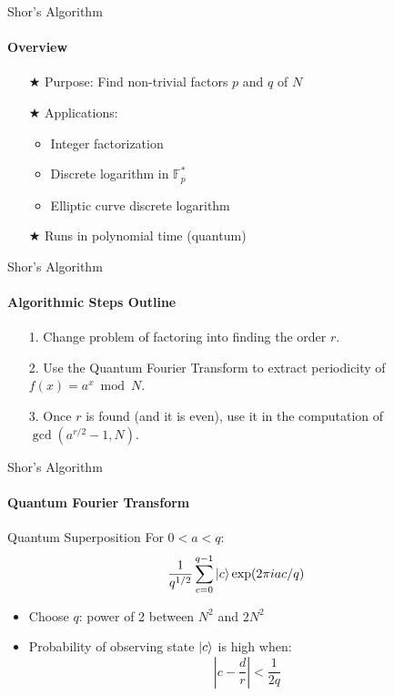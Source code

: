 \documentclass{beamer}
\begin{document}
\begin{frame}{Shor's Algorithm}
	\framesubtitle{Overview}
    \begin{itemize}
        \item[$\bigstar$] Purpose: Find non-trivial factors \(p\) and \(q\) of \(N\)
        \item[$\bigstar$] Applications:
            \begin{itemize}
                \item Integer factorization
                \item Discrete logarithm in \(\mathbb{F}_p^*\)
                \item Elliptic curve discrete logarithm
            \end{itemize}
        \item[$\bigstar$] Runs in polynomial time (quantum)
    \end{itemize}
\end{frame}




\begin{frame}{Shor's Algorithm}
	\framesubtitle{Algorithmic Steps Outline}
	\begin{itemize}
		\item[1.] Change problem of factoring into finding the order \(r\).
		\pause
		\item[2.] Use the Quantum Fourier Transform to extract periodicity of \(f(x) = a^x \bmod N\).
		\pause
		\item[3.] Once \(r\) is found (and it is even), use it in the computation of \(\gcd(a^{r/2} - 1, N)\).   
	\end{itemize}
	
\end{frame}




\begin{frame}{Shor's Algorithm}
	\framesubtitle{Quantum Fourier Transform}
    \begin{block}{Quantum Superposition}
        For \(0 < a < q\):
        \[ \frac{1}{q^{1/2}} \sum_{c = 0}^{q - 1} \ket{c} \exp(2\pi i a c /q) \]
    \end{block}
    \begin{itemize}
        \item Choose \(q\): power of 2 between \(N^2\) and \(2N^2\)
        \item Probability of observing state \(\ket{c}\) is high when:
        \[ \left| c - \frac{d}{r} \right| < \frac{1}{2q} \]
    \end{itemize}
\end{frame}
\end{document}
